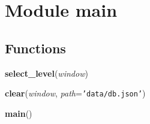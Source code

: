 %
%
%


\section{Module main}

    \label{main}


  \subsection{Functions}

    \label{main:select_level}

    \vspace{0.5ex}

\hspace{.8\funcindent}\begin{boxedminipage}{\funcwidth}

    \raggedright \textbf{select\_level}(\textit{window})

\setlength{\parskip}{2ex}
\setlength{\parskip}{1ex}
    \end{boxedminipage}

    \label{main:clear}

    \vspace{0.5ex}

\hspace{.8\funcindent}\begin{boxedminipage}{\funcwidth}

    \raggedright \textbf{clear}(\textit{window}, \textit{path}={\tt 'data/db.json'})

\setlength{\parskip}{2ex}
\setlength{\parskip}{1ex}
    \end{boxedminipage}

    \label{main:main}

    \vspace{0.5ex}

\hspace{.8\funcindent}\begin{boxedminipage}{\funcwidth}

    \raggedright \textbf{main}()

\setlength{\parskip}{2ex}
\setlength{\parskip}{1ex}
    \end{boxedminipage}

